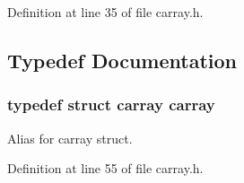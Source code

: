 Definition at line 35 of file carray.\+h.



\subsection{Typedef Documentation}
\subsubsection[{carray}]{\setlength{\rightskip}{0pt plus 5cm}typedef struct {\bf carray} {\bf carray}}\label{group__cst__group_ga1555d5c8eff5c3672cfb92c56fe5a776}
Alias for carray struct. 

Definition at line 55 of file carray.\+h.

